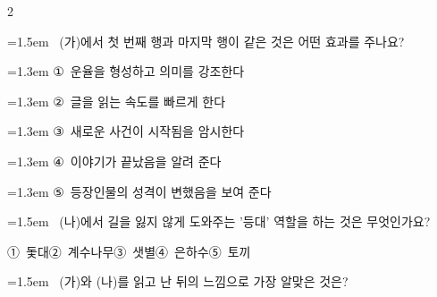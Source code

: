 \documentclass[12pt, a4paper]{article}
\begin{document}
\begin{multicols}{2}
\begin{minipage}{\columnwidth}
\vspace{4mm}
\end{minipage}
\par

\noindent\begin{minipage}{\columnwidth}
\vspace{2mm}
{\hangindent=1.5em  ~(가)에서 첫 번째 행과 마지막 행이 같은 것은 어떤 효과를 주나요?\par}

\vspace{0.5mm}
{\hangindent=1.3em  \noindent\hspace{0.3em}①~운율을 형성하고 의미를 강조한다\par}
{\hangindent=1.3em  \noindent\hspace{0.3em}②~글을 읽는 속도를 빠르게 한다\par}
{\hangindent=1.3em  \noindent\hspace{0.3em}③~새로운 사건이 시작됨을 암시한다\par}
{\hangindent=1.3em  \noindent\hspace{0.3em}④~이야기가 끝났음을 알려 준다\par}
{\hangindent=1.3em  \noindent\hspace{0.3em}⑤~등장인물의 성격이 변했음을 보여 준다\par}
\vspace{4mm}
\end{minipage}
\par

\noindent\begin{minipage}{\columnwidth}
\vspace{2mm}
{\hangindent=1.5em  ~(나)에서 길을 잃지 않게 도와주는 '등대' 역할을 하는 것은 무엇인가요?\par}

\vspace{0.5mm}
\noindent
\mbox{①~돛대}\hspace{1em}\mbox{②~계수나무}\hspace{1em}\mbox{③~샛별}\hspace{1em}\mbox{④~은하수}\hspace{1em}\mbox{⑤~토끼}

\vspace{4mm}
\end{minipage}
\par

\noindent\begin{minipage}{\columnwidth}
\vspace{2mm}
{\hangindent=1.5em  ~(가)와 (나)를 읽고 난 뒤의 느낌으로 가장 알맞은 것은?\par}


\end{minipage}
\end{multicols}
\end{document}
